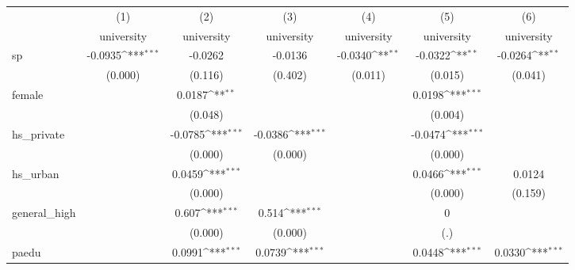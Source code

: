 {
\def\sym#1{\ifmmode^{#1}\else\(^{#1}\)\fi}
\begin{tabular}{l*{6}{c}}
\hline\hline
            &\multicolumn{1}{c}{(1)}&\multicolumn{1}{c}{(2)}&\multicolumn{1}{c}{(3)}&\multicolumn{1}{c}{(4)}&\multicolumn{1}{c}{(5)}&\multicolumn{1}{c}{(6)}\\
            &\multicolumn{1}{c}{university}&\multicolumn{1}{c}{university}&\multicolumn{1}{c}{university}&\multicolumn{1}{c}{university}&\multicolumn{1}{c}{university}&\multicolumn{1}{c}{university}\\
\hline
sp          &     -0.0935\sym{***}&     -0.0262         &     -0.0136         &     -0.0340\sym{**} &     -0.0322\sym{**} &     -0.0264\sym{**} \\
            &     (0.000)         &     (0.116)         &     (0.402)         &     (0.011)         &     (0.015)         &     (0.041)         \\
[1em]
female      &                     &      0.0187\sym{**} &                     &                     &      0.0198\sym{***}&                     \\
            &                     &     (0.048)         &                     &                     &     (0.004)         &                     \\
[1em]
hs\_private  &                     &     -0.0785\sym{***}&     -0.0386\sym{***}&                     &     -0.0474\sym{***}&                     \\
            &                     &     (0.000)         &     (0.000)         &                     &     (0.000)         &                     \\
[1em]
hs\_urban    &                     &      0.0459\sym{***}&                     &                     &      0.0466\sym{***}&      0.0124         \\
            &                     &     (0.000)         &                     &                     &     (0.000)         &     (0.159)         \\
[1em]
general\_high&                     &       0.607\sym{***}&       0.514\sym{***}&                     &           0         &                     \\
            &                     &     (0.000)         &     (0.000)         &                     &         (.)         &                     \\
[1em]
paedu       &                     &      0.0991\sym{***}&      0.0739\sym{***}&                     &      0.0448\sym{***}&      0.0330\sym{***}\\

\end{tabular}}
